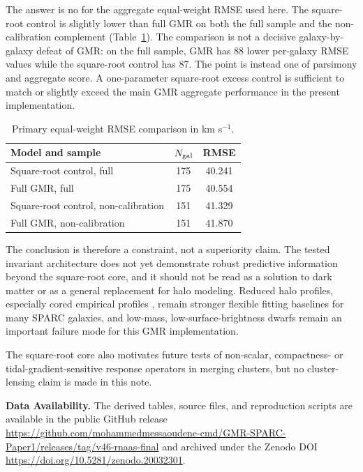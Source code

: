 \documentclass[RNAAS]{aastex701}
\begin{document}
The answer is no for the aggregate equal-weight RMSE used here. The square-root control is slightly lower than full GMR on both the full sample and the non-calibration complement (Table~\ref{tab:metrics}). The comparison is not a decisive galaxy-by-galaxy defeat of GMR: on the full sample, GMR has 88 lower per-galaxy RMSE values while the square-root control has 87. The point is instead one of parsimony and aggregate score. A one-parameter square-root excess control is sufficient to match or slightly exceed the main GMR aggregate performance in the present implementation.

\begin{table}[h]
\centering
\caption{Primary equal-weight RMSE comparison in km s$^{-1}$.}
\label{tab:metrics}
\begin{tabular}{lcc}
\hline
Model and sample & $N_{\rm gal}$ & RMSE \\
\hline
Square-root control, full & 175 & 40.241\\
Full GMR, full & 175 & 40.554\\
Square-root control, non-calibration & 151 & 41.329\\
Full GMR, non-calibration & 151 & 41.870\\
\hline
\end{tabular}
\end{table}

The conclusion is therefore a constraint, not a superiority claim. The tested invariant architecture does not yet demonstrate robust predictive information beyond the square-root core, and it should not be read as a solution to dark matter or as a general replacement for halo modeling. Reduced halo profiles, especially cored empirical profiles \citep[e.g.,][]{burkert1995}, remain stronger flexible fitting baselines for many SPARC galaxies, and low-mass, low-surface-brightness dwarfs remain an important failure mode for this GMR implementation.

The square-root core also motivates future tests of non-scalar, compactness- or tidal-gradient-sensitive response operators in merging clusters, but no cluster-lensing claim is made in this note.

\par\medskip\noindent\textbf{Data Availability.}
The derived tables, source files, and reproduction scripts are available in the public GitHub release \url{https://github.com/mohammedmessaoudene-cmd/GMR-SPARC-Paper1/releases/tag/v46-rnaas-final} and archived under the Zenodo DOI \url{https://doi.org/10.5281/zenodo.20032301}.
\end{document}
